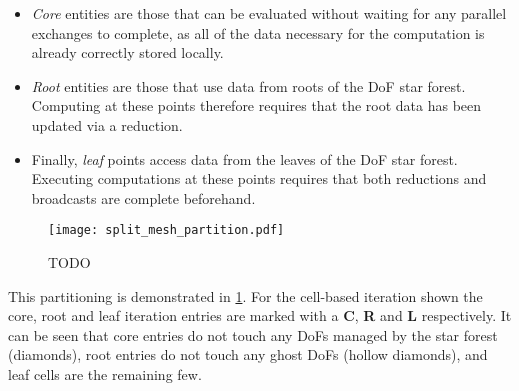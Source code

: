 \documentclass[thesis]{subfiles}
\begin{document}
\begin{itemize}
  \item
    \textit{Core} entities are those that can be evaluated without waiting for any parallel exchanges to complete, as all of the data necessary for the computation is already correctly stored locally.

  \item
    \textit{Root} entities are those that use data from roots of the DoF star forest.
    Computing at these points therefore requires that the root data has been updated via a reduction.

  \item
    Finally, \textit{leaf} points access data from the leaves of the DoF star forest.
    Executing computations at these points requires that both reductions and broadcasts are complete beforehand.
\end{itemize}

\begin{figure}
  \centering
  \texttt{[image: split\_mesh\_partition.pdf]}
  \caption{TODO}
  \label{fig:split_mesh_partition}
\end{figure}

This partitioning is demonstrated in \cref{fig:split_mesh_partition}.
For the cell-based iteration shown the core, root and leaf iteration entries are marked with a \textbf{C}, \textbf{R} and \textbf{L} respectively.
It can be seen that core entries do not touch any DoFs managed by the star forest (diamonds), root entries do not touch any ghost DoFs (hollow diamonds), and leaf cells are the remaining few.
\end{document}
